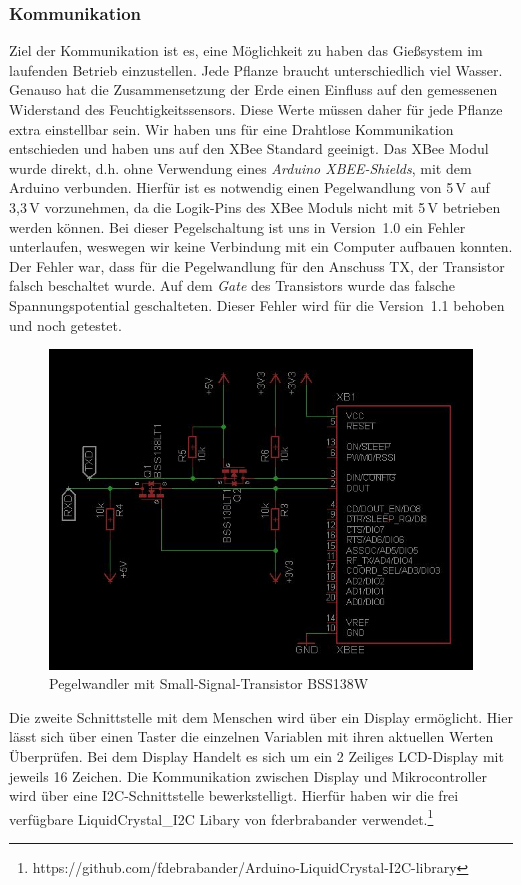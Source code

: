 ﻿\documentclass[]{IEEEtran}
\begin{document}
\subsubsection{Kommunikation}
Ziel der Kommunikation ist es, eine Möglichkeit zu haben das Gießsystem im laufenden Betrieb einzustellen. Jede Pflanze braucht unterschiedlich viel Wasser. Genauso hat die Zusammensetzung der Erde einen Einfluss auf den gemessenen Widerstand des Feuchtigkeitssensors. Diese Werte müssen daher für jede Pflanze extra einstellbar sein. 
Wir haben uns für eine Drahtlose Kommunikation entschieden und haben uns auf den XBee Standard geeinigt. Das XBee Modul wurde direkt, d.h. ohne Verwendung eines \emph{Arduino XBEE-Shields}, mit dem Arduino verbunden. Hierfür ist es notwendig einen Pegelwandlung von 5\,V auf 3,3\,V vorzunehmen, da die Logik-Pins des XBee Moduls nicht mit 5\,V betrieben werden können. Bei dieser Pegelschaltung ist uns in Version~1.0 ein Fehler unterlaufen, weswegen wir keine Verbindung mit ein Computer aufbauen konnten. Der Fehler war, dass für die Pegelwandlung für den Anschuss TX, der Transistor falsch beschaltet wurde. Auf dem \emph{Gate} des Transistors wurde das falsche Spannungspotential geschalteten. Dieser Fehler wird für die Version~1.1 behoben und noch getestet.
\begin{figure}
	\centering
	\includegraphics[width=0.8\linewidth]{bilder/v1SchaltplanXbee.jpg}
	\caption{Pegelwandler mit Small-Signal-Transistor BSS138W }
	\label{fig-Pegel}
\end{figure}
		
Die zweite Schnittstelle mit dem Menschen wird über ein Display ermöglicht. Hier lässt sich über einen Taster die einzelnen Variablen mit ihren aktuellen Werten Überprüfen. Bei dem Display Handelt es sich um ein 2 Zeiliges LCD-Display mit jeweils 16 Zeichen. Die Kommunikation zwischen Display und Mikrocontroller wird über eine I2C-Schnittstelle bewerkstelligt. Hierfür haben wir die frei verfügbare LiquidCrystal\_I2C Libary von fderbrabander verwendet.\footnote{https://github.com/fdebrabander/Arduino-LiquidCrystal-I2C-library}
	
\end{document}
